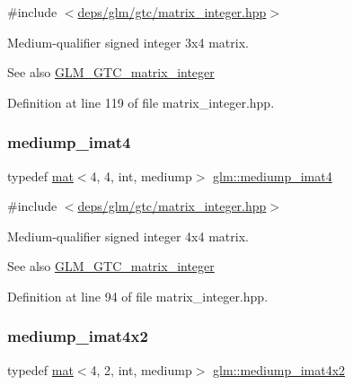 {\ttfamily \#include $<$\hyperlink{matrix__integer_8hpp}{deps/glm/gtc/matrix\+\_\+integer.\+hpp}$>$}

Medium-\/qualifier signed integer 3x4 matrix. \begin{DoxySeeAlso}{See also}
\hyperlink{group__gtc__matrix__integer}{G\+L\+M\+\_\+\+G\+T\+C\+\_\+matrix\+\_\+integer} 
\end{DoxySeeAlso}


Definition at line 119 of file matrix\+\_\+integer.\+hpp.

\mbox{\label{group__gtc__matrix__integer_ga3ce415f7039ec7f1ad5bffa14d226e80}} 
\subsubsection{\texorpdfstring{mediump\+\_\+imat4}{mediump\_imat4}}
{\footnotesize\ttfamily typedef \hyperlink{structglm_1_1mat}{mat}$<$4, 4, int, mediump$>$ \hyperlink{group__gtc__matrix__integer_ga3ce415f7039ec7f1ad5bffa14d226e80}{glm\+::mediump\+\_\+imat4}}



{\ttfamily \#include $<$\hyperlink{matrix__integer_8hpp}{deps/glm/gtc/matrix\+\_\+integer.\+hpp}$>$}

Medium-\/qualifier signed integer 4x4 matrix. \begin{DoxySeeAlso}{See also}
\hyperlink{group__gtc__matrix__integer}{G\+L\+M\+\_\+\+G\+T\+C\+\_\+matrix\+\_\+integer} 
\end{DoxySeeAlso}


Definition at line 94 of file matrix\+\_\+integer.\+hpp.

\mbox{\label{group__gtc__matrix__integer_ga536fe339834f7e764672c22c63ec543b}} 
\subsubsection{\texorpdfstring{mediump\+\_\+imat4x2}{mediump\_imat4x2}}
{\footnotesize\ttfamily typedef \hyperlink{structglm_1_1mat}{mat}$<$4, 2, int, mediump$>$ \hyperlink{group__gtc__matrix__integer_ga536fe339834f7e764672c22c63ec543b}{glm\+::mediump\+\_\+imat4x2}}



